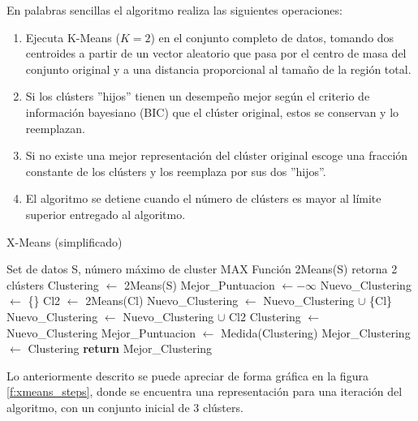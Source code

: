 En palabras sencillas el algoritmo realiza las siguientes operaciones:
\begin{enumerate}
    \item Ejecuta K-Means ($K=2$) en el conjunto completo de datos, tomando dos centroides a partir de un vector aleatorio que pasa por el centro de masa del conjunto original y a una distancia proporcional al tamaño de la región total.
    \item Si los clústers ''hijos'' tienen un desempeño mejor según el criterio de información bayesiano (BIC) que el clúster original, estos se conservan y lo reemplazan. 
    \item Si no existe una mejor representación del clúster original escoge una fracción constante de los clústers y los reemplaza por sus dos ''hijos''.
    \item El algoritmo se detiene cuando el número de clústers es mayor al límite superior entregado al algoritmo.
\end{enumerate}

\begin{algorithm}{}
\caption{X-Means (simplificado) \cite{montresordecentralized}}\label{alg:xmeans}
\begin{algorithmic}[1]
\Require Set de datos S, número máximo de cluster MAX
\Require Función 2Means(S) retorna 2 clústers
\State Clustering $\gets$ 2Means(S)
\State Mejor\_Puntuacion $\gets -\infty$ 
\State Nuevo\_Clustering $\gets$ \{\}
\State Cl2 $\gets$ 2Means(Cl)
\State Nuevo\_Clustering $\gets$ Nuevo\_Clustering $ \cup $ \{Cl\}
\Else
\State Nuevo\_Clustering $\gets$ Nuevo\_Clustering $ \cup $ Cl2
\EndIf
\EndFor
\State Clustering $\gets$ Nuevo\_Clustering
\State Mejor\_Puntuacion $\gets$ Medida(Clustering)
\State Mejor\_Clustering $\gets$ Clustering
\EndIf
\EndWhile\label{euclidendwhile}
\State \textbf{return} Mejor\_Clustering %
\end{algorithmic}
\end{algorithm}

Lo anteriormente descrito se puede apreciar de forma gráfica en la figura \ref{f:xmeans_steps}, donde se encuentra una representación para una iteración del algoritmo, con un conjunto inicial de 3 clústers.

